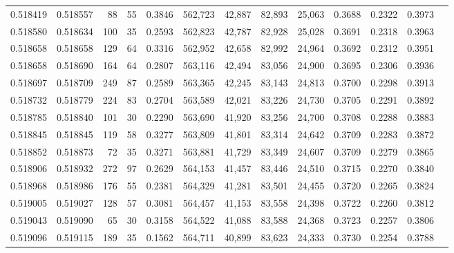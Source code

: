 \begin{tabular}{rrrrrrrrrrrrr}
0.518419 & 0.518557 &    88 &    55 &                                     0.3846 & 562,723 &  42,887 &  82,893 &  25,063 & 0.3688 & 0.2322 & 0.3973 \\
0.518580 & 0.518634 &   100 &    35 &                                     0.2593 & 562,823 &  42,787 &  82,928 &  25,028 & 0.3691 & 0.2318 & 0.3963 \\
0.518658 & 0.518658 &   129 &    64 &                                     0.3316 & 562,952 &  42,658 &  82,992 &  24,964 & 0.3692 & 0.2312 & 0.3951 \\
0.518658 & 0.518690 &   164 &    64 &                                     0.2807 & 563,116 &  42,494 &  83,056 &  24,900 & 0.3695 & 0.2306 & 0.3936 \\
0.518697 & 0.518709 &   249 &    87 &                                     0.2589 & 563,365 &  42,245 &  83,143 &  24,813 & 0.3700 & 0.2298 & 0.3913 \\
0.518732 & 0.518779 &   224 &    83 &                                     0.2704 & 563,589 &  42,021 &  83,226 &  24,730 & 0.3705 & 0.2291 & 0.3892 \\
0.518785 & 0.518840 &   101 &    30 &                                     0.2290 & 563,690 &  41,920 &  83,256 &  24,700 & 0.3708 & 0.2288 & 0.3883 \\
0.518845 & 0.518845 &   119 &    58 &                                     0.3277 & 563,809 &  41,801 &  83,314 &  24,642 & 0.3709 & 0.2283 & 0.3872 \\
0.518852 & 0.518873 &    72 &    35 &                                     0.3271 & 563,881 &  41,729 &  83,349 &  24,607 & 0.3709 & 0.2279 & 0.3865 \\
0.518906 & 0.518932 &   272 &    97 &                                     0.2629 & 564,153 &  41,457 &  83,446 &  24,510 & 0.3715 & 0.2270 & 0.3840 \\
0.518968 & 0.518986 &   176 &    55 &                                     0.2381 & 564,329 &  41,281 &  83,501 &  24,455 & 0.3720 & 0.2265 & 0.3824 \\
0.519005 & 0.519027 &   128 &    57 &                                     0.3081 & 564,457 &  41,153 &  83,558 &  24,398 & 0.3722 & 0.2260 & 0.3812 \\
0.519043 & 0.519090 &    65 &    30 &                                     0.3158 & 564,522 &  41,088 &  83,588 &  24,368 & 0.3723 & 0.2257 & 0.3806 \\
0.519096 & 0.519115 &   189 &    35 &                                     0.1562 & 564,711 &  40,899 &  83,623 &  24,333 & 0.3730 & 0.2254 & 0.3788 \\

\end{tabular}
